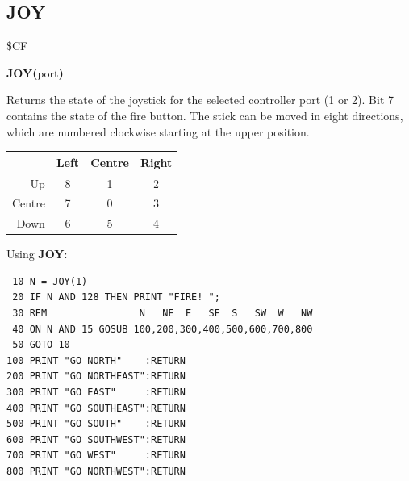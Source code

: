 \subsection{JOY}
\begin{description}[leftmargin=2cm,style=nextline]
\item [Token:] \$CF
\item [Format:] {\bf JOY(}port{\bf)}
\item [Usage:] Returns the state of the
               joystick for the selected controller port (1 or 2).
               Bit 7 contains the state of the fire button.
               The stick can be moved in eight directions, which
               are numbered clockwise starting at the upper position.
\begin{center}
{\setlength{\tabcolsep}{1mm}
\begin{tabular}{|r|c|c|c|}
\hline
&  {\bf Left}  & {\bf Centre} & {\bf Right} \\
\hline
Up     &  8 &    1  & 2 \\
Centre &  7 &    0  & 3 \\
Down   &  6 &    5  & 4 \\
\hline
\end{tabular}
}
\end{center}

\item [Example:] Using {\bf JOY}:
\begin{tcolorbox}[colback=black,coltext=white]
\verbatimfont{\codefont}
\begin{verbatim}
 10 N = JOY(1)
 20 IF N AND 128 THEN PRINT "FIRE! ";
 30 REM                N   NE  E   SE  S   SW  W   NW
 40 ON N AND 15 GOSUB 100,200,300,400,500,600,700,800
 50 GOTO 10
100 PRINT "GO NORTH"    :RETURN
200 PRINT "GO NORTHEAST":RETURN
300 PRINT "GO EAST"     :RETURN
400 PRINT "GO SOUTHEAST":RETURN
500 PRINT "GO SOUTH"    :RETURN
600 PRINT "GO SOUTHWEST":RETURN
700 PRINT "GO WEST"     :RETURN
800 PRINT "GO NORTHWEST":RETURN
\end{verbatim}
\end{tcolorbox}
\end{description}


\newpage
